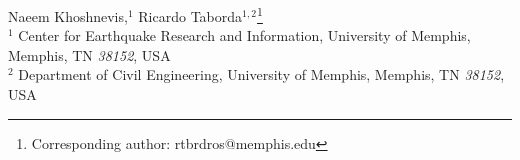 % 
Naeem Khoshnevis,$^{1}$
Ricardo Taborda$^{1,2}$\thanks{Corresponding author: rtbrdros@memphis.edu}\vspace{0.5ex}\\
% 

$^1$ Center for Earthquake Research and Information, University of Memphis, Memphis, TN \emph{38152}, USA\\
$^2$ Department of Civil Engineering, University of Memphis, Memphis, TN \emph{38152}, USA\\
% 